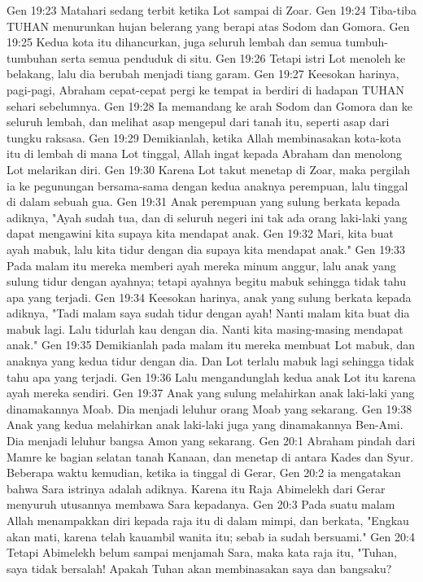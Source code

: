 Gen 19:23  Matahari sedang terbit ketika Lot sampai di Zoar.
Gen 19:24  Tiba-tiba TUHAN menurunkan hujan belerang yang berapi atas Sodom dan Gomora.
Gen 19:25  Kedua kota itu dihancurkan, juga seluruh lembah dan semua tumbuh-tumbuhan serta semua penduduk di situ.
Gen 19:26  Tetapi istri Lot menoleh ke belakang, lalu dia berubah menjadi tiang garam.
Gen 19:27  Keesokan harinya, pagi-pagi, Abraham cepat-cepat pergi ke tempat ia berdiri di hadapan TUHAN sehari sebelumnya.
Gen 19:28  Ia memandang ke arah Sodom dan Gomora dan ke seluruh lembah, dan melihat asap mengepul dari tanah itu, seperti asap dari tungku raksasa.
Gen 19:29  Demikianlah, ketika Allah membinasakan kota-kota itu di lembah di mana Lot tinggal, Allah ingat kepada Abraham dan menolong Lot melarikan diri.
Gen 19:30  Karena Lot takut menetap di Zoar, maka pergilah ia ke pegunungan bersama-sama dengan kedua anaknya perempuan, lalu tinggal di dalam sebuah gua.
Gen 19:31  Anak perempuan yang sulung berkata kepada adiknya, "Ayah sudah tua, dan di seluruh negeri ini tak ada orang laki-laki yang dapat mengawini kita supaya kita mendapat anak.
Gen 19:32  Mari, kita buat ayah mabuk, lalu kita tidur dengan dia supaya kita mendapat anak."
Gen 19:33  Pada malam itu mereka memberi ayah mereka minum anggur, lalu anak yang sulung tidur dengan ayahnya; tetapi ayahnya begitu mabuk sehingga tidak tahu apa yang terjadi.
Gen 19:34  Keesokan harinya, anak yang sulung berkata kepada adiknya, "Tadi malam saya sudah tidur dengan ayah! Nanti malam kita buat dia mabuk lagi. Lalu tidurlah kau dengan dia. Nanti kita masing-masing mendapat anak."
Gen 19:35  Demikianlah pada malam itu mereka membuat Lot mabuk, dan anaknya yang kedua tidur dengan dia. Dan Lot terlalu mabuk lagi sehingga tidak tahu apa yang terjadi.
Gen 19:36  Lalu mengandunglah kedua anak Lot itu karena ayah mereka sendiri.
Gen 19:37  Anak yang sulung melahirkan anak laki-laki yang dinamakannya Moab. Dia menjadi leluhur orang Moab yang sekarang.
Gen 19:38  Anak yang kedua melahirkan anak laki-laki juga yang dinamakannya Ben-Ami. Dia menjadi leluhur bangsa Amon yang sekarang.
Gen 20:1  Abraham pindah dari Mamre ke bagian selatan tanah Kanaan, dan menetap di antara Kades dan Syur. Beberapa waktu kemudian, ketika ia tinggal di Gerar,
Gen 20:2  ia mengatakan bahwa Sara istrinya adalah adiknya. Karena itu Raja Abimelekh dari Gerar menyuruh utusannya membawa Sara kepadanya.
Gen 20:3  Pada suatu malam Allah menampakkan diri kepada raja itu di dalam mimpi, dan berkata, "Engkau akan mati, karena telah kauambil wanita itu; sebab ia sudah bersuami."
Gen 20:4  Tetapi Abimelekh belum sampai menjamah Sara, maka kata raja itu, "Tuhan, saya tidak bersalah! Apakah Tuhan akan membinasakan saya dan bangsaku?

